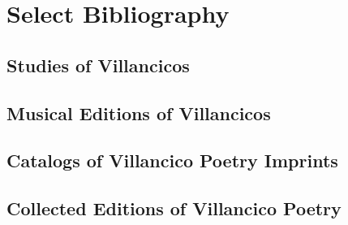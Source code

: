 \section*{Select Bibliography}

\subsection*{Studies of Villancicos}
\nocite{Rubio:Forma}
\nocite{Laird:VC}
\nocite{Torrente:PhD}
\nocite{Tenorio:SorJuana}
\nocite{CaberoPueyo:PhD}
\nocite{Illari:Polychoral}
\nocite{Knighton-Torrente:VCs}
\nocite{Cashner:Cards}
\nocite{LopezLorenzo:VC-Sevillano}
\printbibliography[heading=none,filter=villancico-studies]

\subsection*{Musical Editions of Villancicos}
\nocite{Cererols:MEM-VC}
\nocite{Stevenson:Christmas}
\nocite{Ruimonte:Parnaso}
\nocite{Padilla:Tello}
\nocite{Ezquerro:MME55}
\nocite{RuizSamaniego:MME63}
\nocite{Ezquerro:MME59}
\nocite{Ezquerro:MME65}
\nocite{Fernandez:Cancionero}
\nocite{Torrejon:VCs}
\printbibliography[heading=none,filter=villancico-editions]

\subsection*{Catalogs of Villancico Poetry Imprints}
\nocite{BNE:VCs17C}
\nocite{BNE:VCs18C}
\nocite{UK:VCs}
\nocite{US:VCs}
\nocite{Codina:MontserratVCs}
\printbibliography[heading=none,filter=villancico-imprint-catalogs]

\subsection*{Collected Editions of Villancico Poetry}
\nocite{SorJuana:VC}
\nocite{LeonMarchante:Obras1733}
\nocite{Sanchez:LiraPoetica}
\printbibliography[heading=none,filter=villancico-poetry-editions]

